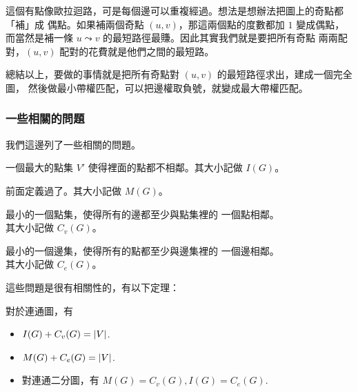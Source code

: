 \documentclass[a4paper,12pt]{book}
\begin{document}
這個有點像歐拉迴路，可是每個邊可以重複經過。想法是想辦法把圖上的奇點都「補」成
偶點。如果補兩個奇點 $(u, v)$，那這兩個點的度數都加 $1$ 變成偶點，
而當然是補一條 $u \leadsto v$ 的最短路徑最賺。因此其實我們就是要把所有奇點
兩兩配對，$(u, v)$ 配對的花費就是他們之間的最短路。 

總結以上，要做的事情就是把所有奇點對 $(u, v)$ 的最短路徑求出，建成一個完全圖，
然後做最小帶權匹配，可以把邊權取負號，就變成最大帶權匹配。

\subsubsection{一些相關的問題}
我們這邊列了一些相關的問題。
\begin{description}[leftmargin=*]
  \item[最大獨立點集] 一個最大的點集 $V'$ 使得裡面的點都不相鄰。其大小記做 $I(G)$。
  \item[最大匹配數] 前面定義過了。其大小記做 $M(G)$。
  \item[最小點覆蓋] 最小的一個點集，使得所有的邊都至少與點集裡的
    一個點相鄰。\\其大小記做 $C_v(G)$。
  \item[最小邊覆蓋] 最小的一個邊集，使得所有的點都至少與邊集裡的
    一個邊相鄰。\\其大小記做 $C_e(G)$。
\end{description}

\begin{figure}[H]
  \centering
  
\end{figure}
這些問題是很有相關性的，有以下定理：
\begin{theorem}
  對於連通圖，有
  \begin{itemize}
      \item $I(G) + C_v(G) = \lvert V \rvert$. 
        \listeqn \label{eq:m1}
      \item $M(G) + C_e(G) = \lvert V \rvert$.
        \listeqn \label{eq:m2}
      \item 對連通二分圖，有 $M(G) = C_v(G), I(G) = C_e(G)$.
        \listeqn \label{eq:m3}
  \end{itemize}
\end{theorem}
\end{document}
